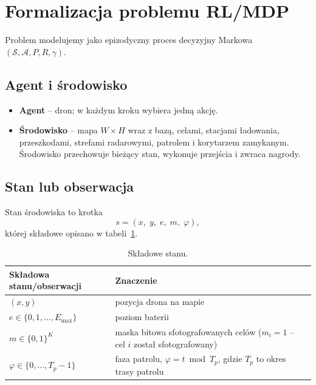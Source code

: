 \section{Formalizacja problemu RL/MDP}
\label{sec:formalizacja}

Problem modelujemy jako epizodyczny proces decyzyjny Markowa
$(\mathcal{S}, \mathcal{A}, P, R, \gamma)$.

\subsection{Agent i środowisko}

\begin{itemize}
  \item \textbf{Agent} -- dron; w każdym kroku wybiera jedną akcję.
  \item \textbf{Środowisko} -- mapa $W \times H$ wraz z bazą, celami,
        stacjami ładowania, przeszkodami, strefami radarowymi, patrolem
        i korytarzem zamykanym. Środowisko przechowuje bieżący stan, wykonuje
        przejścia i zwraca nagrody.
\end{itemize}

\subsection{Stan lub obserwacja}

Stan środowiska to krotka
\begin{equation}
  s = (x,\; y,\; e,\; m,\; \varphi),
\end{equation}
której składowe opisano w tabeli~\ref{tab:stan}.

\begin{table}[h]
\centering
\begin{tabular}{p{}p{}}
\toprule
Składowa stanu/obserwacji & Znaczenie \\
\midrule
$(x, y)$ & pozycja drona na mapie \\
$e \in \{0, 1, \dots, E_{\max}\}$ & poziom baterii \\
$m \in \{0,1\}^K$ & maska bitowa sfotografowanych celów
  ($m_i = 1$ -- cel $i$ został sfotografowany) \\
$\varphi \in \{0, \dots, T_p - 1\}$ & faza patrolu, $\varphi = t \bmod T_p$,
  gdzie $T_p$ to okres trasy patrolu \\
\bottomrule
\end{tabular}
\caption{Składowe stanu.}
\label{tab:stan}
\end{table}

